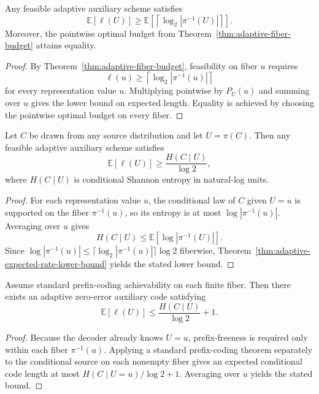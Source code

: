 \begin{theorem}\label{thm:adaptive-expected-rate-lower-bound}
Any feasible adaptive auxiliary scheme satisfies
\[
\mathbb E[\ell(U)] \ge \mathbb E\!\left[\left\lceil \log_2 |\pi^{-1}(U)| \right\rceil\right].
\]
Moreover, the pointwise optimal budget from Theorem~\ref{thm:adaptive-fiber-budget} attains equality.
\end{theorem}

\begin{proof}
By Theorem~\ref{thm:adaptive-fiber-budget}, feasibility on fiber $u$ requires
\[
\ell(u) \ge \left\lceil \log_2 |\pi^{-1}(u)| \right\rceil
\]
for every representation value $u$. Multiplying pointwise by $P_U(u)$ and summing over $u$ gives the lower bound on expected length. Equality is achieved by choosing the pointwise optimal budget on every fiber.
\end{proof}

\begin{corollary}
Let $C$ be drawn from any source distribution and let $U=\pi(C)$. Then any feasible adaptive auxiliary scheme satisfies
\[
\mathbb E[\ell(U)] \ge \frac{H(C\mid U)}{\log 2},
\]
where $H(C\mid U)$ is conditional Shannon entropy in natural-log units.
\end{corollary}

\begin{proof}
For each representation value $u$, the conditional law of $C$ given $U=u$ is supported on the fiber $\pi^{-1}(u)$, so its entropy is at most $\log |\pi^{-1}(u)|$. Averaging over $u$ gives
\[
H(C\mid U) \le \mathbb E[\log |\pi^{-1}(U)|].
\]
Since $\log |\pi^{-1}(u)| \le \lceil \log_2 |\pi^{-1}(u)| \rceil \log 2$ fiberwise, Theorem~\ref{thm:adaptive-expected-rate-lower-bound} yields the stated lower bound.
\end{proof}

\begin{theorem}\label{thm:fiberwise-prefix-coding-upper-bound}
Assume standard prefix-coding achievability on each finite fiber. Then there exists an adaptive zero-error auxiliary code satisfying
\[
\mathbb E[\ell(U)] \le \frac{H(C\mid U)}{\log 2} + 1.
\]
\end{theorem}

\begin{proof}
Because the decoder already knows $U=u$, prefix-freeness is required only within each fiber $\pi^{-1}(u)$. Applying a standard prefix-coding theorem separately to the conditional source on each nonempty fiber gives an expected conditional code length at most $H(C\mid U=u)/\log 2 + 1$. Averaging over $u$ yields the stated bound.
\end{proof}

